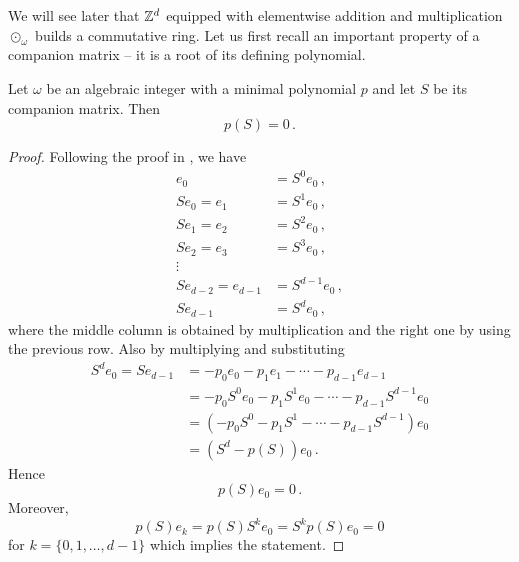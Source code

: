 We will see later that $\mathbb{Z}^d$ equipped with elementwise addition and multiplication $\odot_\omega$ builds a commutative ring. 
Let us first recall an important property of a companion matrix  -- it is a root of its defining polynomial.
\begin{lem}
\label{lem:compMatrixIsRoot}
Let $\omega$ be an algebraic integer with a minimal polynomial $p$ and let $S$ be its companion matrix. Then
$$
p(S)=0\,.
$$
\end{lem}
\begin{proof}
Following the proof in \cite{horn}, we have
\begin{align*}
e_0&=S^0 e_0\,, \\
S e_0= e_1&=S^1 e_0\,, \\
S e_1= e_2&=S^2 e_0\,, \\
S e_2= e_3&=S^3 e_0\,, \\
\vdots & \\
S e_{d-2}= e_{d-1}&=S^{d-1} e_0\,, \\
S e_{d-1} &= S^{d} e_0\,,
\end{align*}
where the middle column is obtained by multiplication and the right one by using the previous row. 
Also by multiplying and substituting
\begin{align*}
S^{d} e_0=S e_{d-1}&= -p_0e_0-p_1e_1-\cdots-p_{d-1}e_{d-1} \\
    &= -p_0 S^{0}e_0-p_1S^{1}e_0-\cdots-p_{d-1}S^{d-1}e_{0} \\
    &= (-p_0 S^{0}-p_1S^{1}-\cdots-p_{d-1}S^{d-1})e_{0} \\
    &=(S^{d}-p(S))e_0\,.
\end{align*}
Hence
$$
p(S)e_0=0\,.
$$
Moreover,
$$
p(S)e_k=p(S)S^k e_0=S^k p(S) e_0=0
$$
for $k=\{0,1,\dots,d-1\}$ which implies the statement.
\end{proof}

